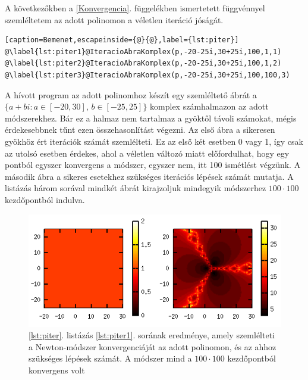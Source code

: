 \documentclass[a4paper,12pt]{report}
\begin{document}
				A következőkben a \ref{Konvergencia}. függelékben ismertetett függvénnyel szemléltetem az adott polinomon a véletlen iteráció jóságát.
				\begin{singlespace}
                \begin{lstlisting}[caption=Bemenet,escapeinside={@}{@},label={lst:piter}]
@\label{lst:piter1}@IteracioAbraKomplex(p,-20-25i,30+25i,100,1,1)
@\label{lst:piter2}@IteracioAbraKomplex(p,-20-25i,30+25i,100,1,2)
@\label{lst:piter3}@IteracioAbraKomplex(p,-20-25i,30+25i,100,100,3)
				\end{lstlisting}
                \end{singlespace}
				A hívott program az adott polinomhoz készít egy szemléltető ábrát a $\{a+bi:a\in[-20,30],\,b\in[-25,25]\}$ komplex számhalmazon az adott módszerekhez. Bár ez a halmaz nem tartalmaz a gyöktől távoli számokat, mégis érdekesebbnek tűnt ezen összehasonlítást végezni. Az első ábra a sikeresen gyökhöz ért iterációk számát szemlélteti. Ez az első két esetben 0 vagy 1, így csak az utolsó esetben érdekes, ahol a véletlen változó miatt előfordulhat, hogy egy pontból egyszer konvergens a módszer, egyszer nem, itt 100 ismétlést végzünk. A második ábra a sikeres esetekhez szükséges iterációs lépések számát mutatja. A listázás három sorával mindkét ábrát kirajzoljuk mindegyik módszerhez $100\cdot 100$ kezdőpontból indulva.

				\begin{figure}[h]
					\centering
					\includegraphics[scale=0.7]{kepek/p-iter1.png}
					\caption{\ref{lst:piter}. listázás \ref{lst:piter1}. sorának eredménye, amely szemlélteti a Newton-módszer konvergenciáját az adott polinomon, és az ahhoz szükséges lépések számát. A módszer mind a $100\cdot 100$ kezdőpontból konvergens volt} \label{fig:piter1}
				\end{figure}
\end{document}
